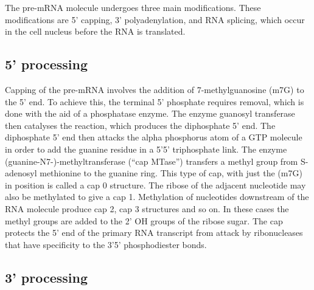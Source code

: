 The pre-mRNA molecule undergoes three main modifications. These modifications are 5' capping, 3' polyadenylation, and RNA splicing, which occur in the cell nucleus before the RNA is translated.

\hypertarget{processing}{%
\subsection{5' processing}\label{processing}}

Capping of the pre-mRNA involves the addition of 7-methylguanosine (m7G) to the 5' end. To achieve this, the terminal 5' phosphate requires removal, which is done with the aid of a phosphatase enzyme. The enzyme guanosyl transferase then catalyses the reaction, which produces the diphosphate 5' end. The diphosphate 5' end then attacks the alpha phosphorus atom of a GTP molecule in order to add the guanine residue in a 5'5' triphosphate link. The enzyme (guanine-N7-)-methyltransferase (``cap MTase'') transfers a methyl group from S-adenosyl methionine to the guanine ring. This type of cap, with just the (m7G) in position is called a cap 0 structure. The ribose of the adjacent nucleotide may also be methylated to give a cap 1. Methylation of nucleotides downstream of the RNA molecule produce cap 2, cap 3 structures and so on. In these cases the methyl groups are added to the 2' OH groups of the ribose sugar. The cap protects the 5' end of the primary RNA transcript from attack by ribonucleases that have specificity to the 3'5' phosphodiester bonds.

\hypertarget{processing-1}{%
\subsection{3' processing}\label{processing-1}}

